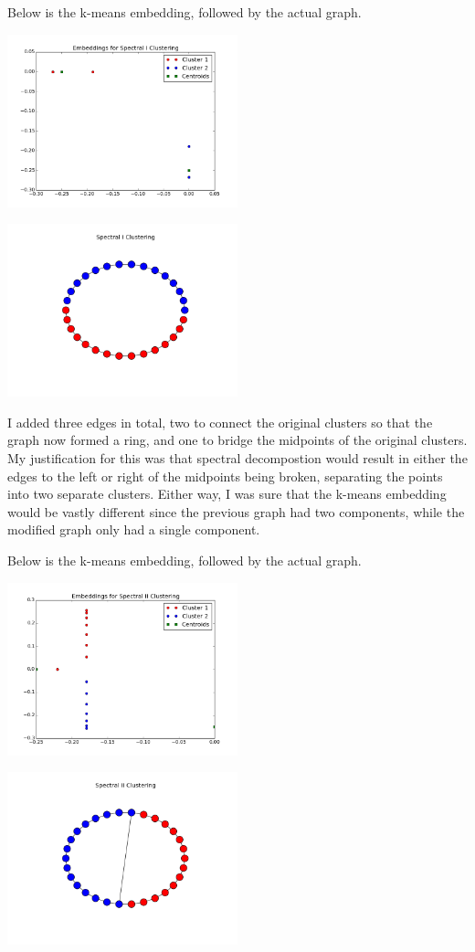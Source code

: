 \documentclass[12pt]{article}
\begin{document}
\begin{enumerate}
Below is the k-means embedding, followed by the actual graph.

\includegraphics[width=0.5\textwidth]{Embeddings_for_Spectral_I_Clustering.png}

\includegraphics[width=0.5\textwidth]{Spectral_I_Clustering.png}

I added three edges in total, two to connect the original clusters so that the graph now formed a ring, and one to bridge the midpoints of the original clusters. My justification for this was that spectral decompostion would result in either the edges to the left or right of the midpoints being broken, separating the points into two separate clusters. Either way, I was sure that the k-means embedding would be vastly different since the previous graph had two components, while the modified graph only had a single component.

Below is the k-means embedding, followed by the actual graph.

\includegraphics[width=0.5\textwidth]{Embeddings_for_Spectral_II_Clustering.png}

\includegraphics[width=0.5\textwidth]{Spectral_II_Clustering.png}

\end{enumerate}
\end{document}
